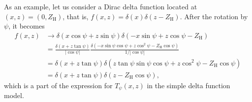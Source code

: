 \documentclass[12pt,letterpaper]{article}
\newcommand{\zh}{Z_\mathrm{H}}
\begin{document}
As an 
example, let us consider a Dirac delta function located at $(x,z)=(0,\zh)$,
that is, $f(x,z)=\delta(x)\delta(z-\zh)$. After the rotation by $\psi$, it 
becomes
\begin{align*}
  f(x,z) 
  &\rightarrow 
    \delta(x\cos\psi+z\sin\psi) \delta(-x\sin\psi+z\cos\psi-\zh) \\
  &= \frac{\delta(x+z\tan\psi)}{|\cos\psi|}
     \frac{\delta(-x\sin\psi\cos\psi+z\cos^2\psi-\zh\cos\psi)}{1/|\cos\psi|} \\
  &= \delta(x+z\tan\psi)\delta(z\tan\psi\sin\psi\cos\psi+z\cos^2\psi-\zh\cos\psi) \\
  &= \delta(x+z\tan\psi)\delta(z-\zh\cos\psi),
\end{align*}
which is a part of the expression for $T_\psi(x,z)$ in the simple delta 
function model.
\end{document}
